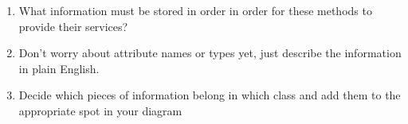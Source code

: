 \documentclass[12pt]{article}
\begin{document}
\begin{enumerate}[1.]
    \item What information must be stored in order in order for these methods to provide
    their services?
    \item Don’t worry about attribute names or types yet, just describe the information
    in plain English.
    \item Decide which pieces of information belong in which class and add them to the
    appropriate spot in your diagram
\end{enumerate}
\end{document}
